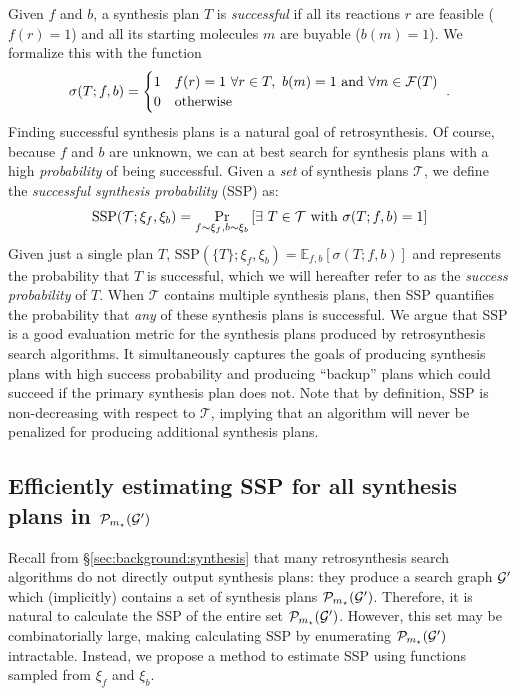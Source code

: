 Given $f$ and $b$,
a synthesis plan $T$ is \emph{successful} if all its reactions $r$ are feasible ($f(r)=1$)
and all its starting molecules $m$ are buyable ($b(m)=1$).
We formalize this with the function
\begin{equation}\label{eqn:success defn for single synthesis plan}
    \sigma(T;f,b) = \begin{cases}
        1 & f(r)=1\ \forall r\in T,\ b(m)=1\text{ and } \forall m\in\mathcal{F}(T) \\
        0 & \text{otherwise}
    \end{cases}\ .
\end{equation}
Finding successful synthesis plans is a natural goal of retrosynthesis.
Of course, because $f$ and $b$ are unknown, 
we can at best search for synthesis plans with a high \emph{probability}
of being successful.
Given a \emph{set} of synthesis plans $\mathcal{T}$,
we define the \emph{successful synthesis probability} (SSP) as:
\begin{equation}\label{eqn:SSP defn}
    \mathrm{SSP}(\mathcal T ; \xi_f, \xi_b) =
    \Pr_{f\sim\xi_f, b\sim\xi_b}\left[
        \exists\ T\in\mathcal T\text{ with } 
        \sigma(T;f,b)=1
    \right]
\end{equation}
Given just a single plan $T$,
$\mathrm{SSP}(\{T\};\xi_f,\xi_b)=\mathbb E_{f,b}\left[\sigma(T;f,b)\right]$
and represents the probability that $T$ is successful,
which we will hereafter refer to as the \emph{success probability} of $T$.
When $\mathcal T$ contains multiple synthesis plans, then 
SSP quantifies the probability that \emph{any} of these synthesis plans is successful.
We argue that SSP is a good evaluation metric for the
synthesis plans produced by retrosynthesis
search algorithms.
It simultaneously captures the goals of 
producing synthesis plans with high success probability
and producing ``backup'' plans
which could succeed if the primary synthesis plan does not.
Note that by definition, SSP is non-decreasing with respect to $\mathcal T$,
implying that an algorithm will never be penalized for producing additional synthesis plans.


\subsection{
    Efficiently estimating SSP for all synthesis plans in 
    \texorpdfstring{$\mathcal{P}_{m_\star}({\mathcal{G}}')$}{P(G)}
}

Recall from \S\ref{sec:background:synthesis} that many retrosynthesis search algorithms
do not directly output synthesis plans:
they produce a search graph ${\mathcal{G}}'$ which (implicitly)
contains a set of synthesis plans $\mathcal{P}_{m_\star}({\mathcal{G}}')$.
Therefore, it is natural to calculate the SSP of the entire set $\mathcal{P}_{m_\star}({\mathcal{G}}')$.
However, this set may be combinatorially large,
making calculating SSP by enumerating $\mathcal{P}_{m_\star}({\mathcal{G}}')$ intractable.
Instead, we propose a method to estimate SSP using functions sampled from $\xi_f$ and $\xi_b$.

